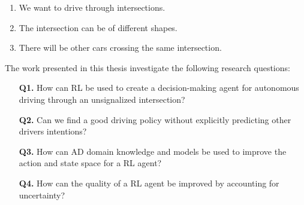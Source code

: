 \begin{enumerate}
	\item We want to drive through intersections. 
	\item The intersection can be of different shapes. %
	\item There will be other cars crossing the same intersection. 
	
\end{enumerate}

The work presented in this thesis investigate the following research questions:
\begin{enumerate}
	\item[\textbf{Q1.}] How can RL be used to create a decision-making agent for autonomous driving through an unsignalized intersection?
	\item[\textbf{Q2.}] Can we find a good driving policy without explicitly predicting other drivers intentions?
	\item[\textbf{Q3.}] How can AD domain knowledge and models be used to improve the action and state space for a RL agent? 
	\item[\textbf{Q4.}] How can the quality of a RL agent be improved by accounting for uncertainty?

\end{enumerate}

